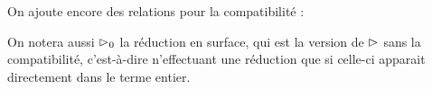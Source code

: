 \begin{rmk}
    On ajoute encore des relations pour la compatibilité :
    \begin{center}
        \begin{prooftree}
        \end{prooftree}
        \qquad
        \begin{prooftree}
        \end{prooftree}
        \qquad
        \begin{prooftree}
        \end{prooftree}

        \vspace{0.5cm}
        
        \begin{prooftree}
        \end{prooftree}
        \qquad
        \begin{prooftree}
        \end{prooftree}

        \vspace{0.5cm}
        
        \begin{prooftree}
        \end{prooftree}
    \end{center}
\end{rmk}

On notera aussi $\reduc_0$ la réduction en surface, qui est la version de $\reduc$ sans la compatibilité, c'est-à-dire n'effectuant une réduction que si celle-ci apparait directement dans le terme entier.

